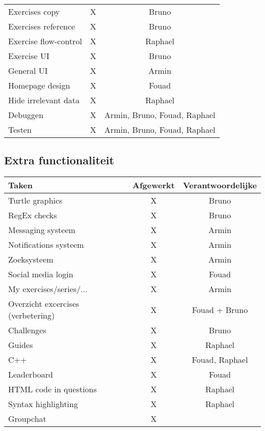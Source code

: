 \begin{tabular}{| l | c | c |}
    Exercises copy          &   X   &   Bruno   \\
    Exercises reference     &   X   &   Bruno   \\
    Exercise flow-control   &   X   &   Raphael \\
    Exercise UI             &   X   &   Bruno   \\
    General UI              &   X   &   Armin   \\
    Homepage design         &   X   &   Fouad   \\
    Hide irrelevant data    &   X   &   Raphael \\
    \hline
    Debuggen                &   X   &   Armin, Bruno, Fouad, Raphael    \\
    Testen                  &   X   &   Armin, Bruno, Fouad, Raphael    \\
    \hline
\end{tabular}


\subsection{Extra functionaliteit}
\begin{tabular}{| l | c | c |}
    \hline
    Taken   &   Afgewerkt   &   Verantwoordelijke \\
    \hline \hline
    Turtle graphics         &   X   &   Bruno   \\
    RegEx checks            &   X   &   Bruno   \\
    Messaging systeem       &   X   &   Armin   \\
    Notifications systeem   &   X   &   Armin   \\
    Zoeksysteem             &   X   &   Armin   \\
    Social media login      &   X   &   Fouad   \\
    My exercises/series/... &   X   &   Armin   \\
    Overzicht excercises (verbetering)  &   X   &   Fouad + Bruno   \\
    Challenges              &   X   &   Bruno   \\
    Guides                  &   X   &   Raphael \\
    C++                     &   X   &   Fouad, Raphael  \\
    Leaderboard             &   X   &   Fouad   \\
    HTML code in questions  &   X   &   Raphael \\
    Syntax highlighting     &   X   &   Raphael \\
    Groupchat               &   X   &   \\
    \hline
\end{tabular}
